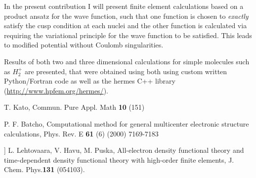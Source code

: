In the present contribution I will present finite element calculations based on a product ansatz for the wave function, such that one function is chosen to {\it exactly} satisfy the cusp condition at each nuclei and the other function is calculated via requiring the variational principle for the wave function  to be satisfied. This leads to modified potential without Coulomb singularities.

Results of both two and three dimensional calculations for simple molecules  such as  $H_2^+$ are presented, that were obtained using both using custom written Python/Fortran code as well as the hermes C++ library (\url{http://www.hpfem.org/hermes/}).


\begin{thebibliography}{10}

T. Kato, Commun. Pure Appl. Math {\bf 10} (151)

P. F. Batcho, Computational method for general multicenter electronic structure calculations,
Phys. Rev. E {\bf 61} (6) (2000) 7169-7183

] L. Lehtovaara, V. Havu, M. Puska, All-electron density functional theory and time-dependent density functional theory with high-order ﬁnite elements, J. Chem. Phys.{\bf 131} (054103).

\end{thebibliography}